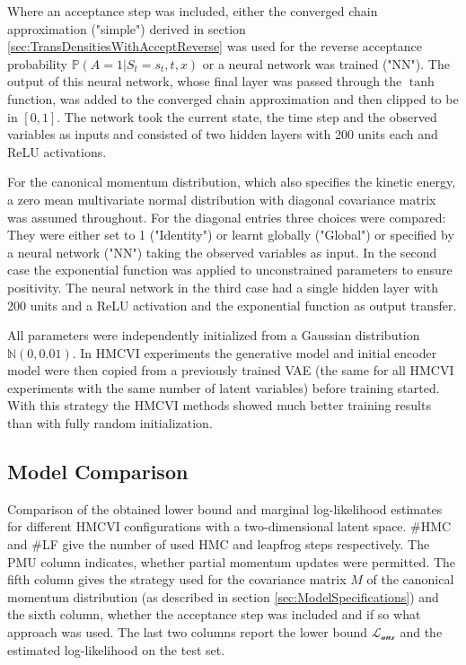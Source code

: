 Where an acceptance step was included, either the converged chain approximation ("simple") derived in section \ref{sec:TransDensitiesWithAcceptReverse} was used for the reverse acceptance probability $\mathbb{P}(A = 1|S_t = s_t, t, x)$ or a neural network was trained ("NN"). The output of this neural network, whose final layer was passed through the $\tanh$ function, was added to the converged chain approximation and then clipped to be in $[0, 1]$. The network took the current state, the time step and the observed variables as inputs and consisted of two hidden layers with 200 units each and ReLU activations.

For the canonical momentum distribution, which also specifies the kinetic energy, a zero mean multivariate normal distribution with diagonal covariance matrix was assumed throughout. For the diagonal entries three choices were compared: They were either set to 1 ("Identity") or learnt globally ("Global") or specified by a neural network ("NN") taking the observed variables as input. In the second case the exponential function was applied to unconstrained parameters to ensure positivity. The neural network in the third case had a single hidden layer with 200 units and a ReLU activation and the exponential function as output transfer.

All parameters were independently initialized from a Gaussian distribution $\mathbb{N}(0, 0.01)$. In HMCVI experiments the generative model and initial encoder model were then copied from a previously trained VAE (the same for all HMCVI experiments with the same number of latent variables) before training started. With this strategy the HMCVI methods showed much better training results than with fully random initialization.

\subsection{Model Comparison}

\begin{table*}
\centering

\caption{Comparison of the obtained lower bound and marginal log-likelihood estimates for different HMCVI configurations with a two-dimensional latent space. \#HMC and \#LF give the number of used HMC and leapfrog steps respectively. The PMU column indicates, whether partial momentum updates were permitted. The fifth column gives the strategy used for the covariance matrix $M$ of the canonical momentum distribution (as described in section \ref{sec:ModelSpecifications}) and the sixth column, whether the acceptance step was included and if so what approach was used. The last two columns report the lower bound $\mathcal{L_\textrm{aux}}$ and the estimated log-likelihood on the test set.}
\label{tab:2dLatentResults}
\end{table*}


